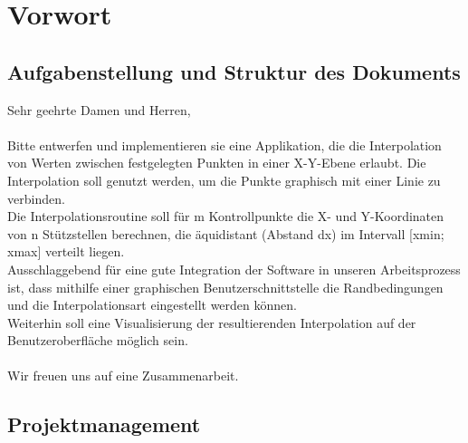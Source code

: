 \chapter{Vorwort}
\label{ch:1}

\section{Aufgabenstellung und Struktur des Dokuments}
\label{sec:1.1}

Sehr geehrte Damen und Herren, \\
\hfill \\
\noindent Bitte entwerfen und implementieren sie eine Applikation, die die Interpolation von Werten
zwischen festgelegten Punkten in einer X-Y-Ebene erlaubt. Die Interpolation soll genutzt
werden, um die Punkte graphisch mit einer Linie zu verbinden.\\
Die Interpolationsroutine soll f\"ur m Kontrollpunkte die X- und Y-Koordinaten von n St\"utzstellen berechnen, die \"aquidistant (Abstand dx) im Intervall [xmin; xmax] verteilt liegen. \\
\noindent Ausschlaggebend f\"ur eine gute Integration der Software in unseren Arbeitsprozess ist, dass
mithilfe einer graphischen Benutzerschnittstelle die Randbedingungen und die Interpolationsart eingestellt werden k\"onnen.\\
\noindent Weiterhin soll eine Visualisierung der resultierenden Interpolation auf der Benutzeroberfl\"ache m\"oglich sein. \\ \\
\noindent Wir freuen uns auf eine Zusammenarbeit. \\ 
\clearpage

\section{Projektmanagement}
\label{sec:1.2}

